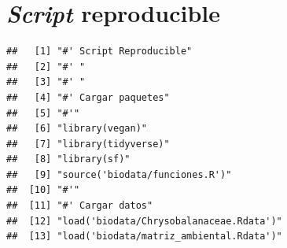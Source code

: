 \documentclass[11pt,]{article}
\begin{document}
\section{\texorpdfstring{\emph{Script}
reproducible}{Script reproducible}}\label{script-reproducible}

\begin{verbatim}
##   [1] "#' Script Reproducible"                                                                                                                                                
##   [2] "#' "                                                                                                                                                                   
##   [3] "#' "                                                                                                                                                                   
##   [4] "#' Cargar paquetes"                                                                                                                                                    
##   [5] "#'"                                                                                                                                                                    
##   [6] "library(vegan)"                                                                                                                                                        
##   [7] "library(tidyverse)"                                                                                                                                                    
##   [8] "library(sf)"                                                                                                                                                           
##   [9] "source('biodata/funciones.R')"                                                                                                                                         
##  [10] "#'"                                                                                                                                                                    
##  [11] "#' Cargar datos"                                                                                                                                                       
##  [12] "load('biodata/Chrysobalanaceae.Rdata')"                                                                                                                                
##  [13] "load('biodata/matriz_ambiental.Rdata')"                                                                                                                                

\end{verbatim}
\end{document}
